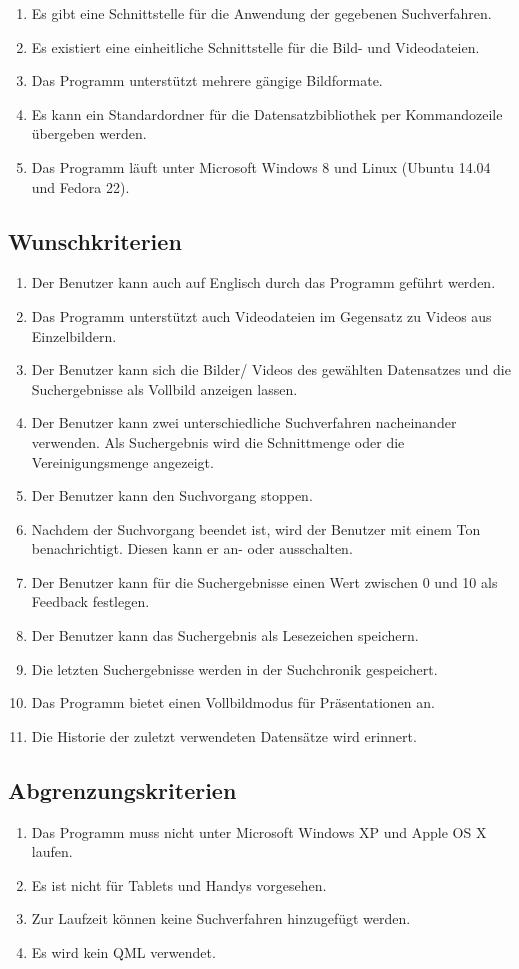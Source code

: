 \begin{enumerate} [label=\bfseries /MK \arabic*0/, leftmargin=*]
\item Es gibt eine Schnittstelle für die Anwendung der gegebenen Suchverfahren.
\item Es existiert eine einheitliche Schnittstelle für die Bild- und Videodateien.
\item Das Programm unterstützt mehrere gängige Bildformate.
\item Es kann ein Standardordner für die Datensatzbibliothek per Kommandozeile übergeben werden.
\item Das Programm läuft unter Microsoft Windows 8 und Linux (Ubuntu 14.04 und Fedora 22).
\end{enumerate}
\subsection{Wunschkriterien}
\begin{enumerate} [label=\bfseries /WK \arabic*0/, leftmargin=*]
\item Der Benutzer kann auch auf Englisch durch das Programm geführt werden.
\item Das Programm unterstützt auch Videodateien im Gegensatz zu Videos aus Einzelbildern.
\item Der Benutzer kann sich die Bilder/ Videos des gewählten Datensatzes und die Suchergebnisse als Vollbild anzeigen lassen.
\item Der Benutzer kann zwei unterschiedliche Suchverfahren nacheinander verwenden. Als Suchergebnis wird die Schnittmenge oder die Vereinigungsmenge angezeigt.
\item Der Benutzer kann den Suchvorgang stoppen.
\item Nachdem der Suchvorgang beendet ist, wird der Benutzer mit einem Ton benachrichtigt. Diesen kann er an- oder ausschalten.
\item Der Benutzer kann für die Suchergebnisse einen Wert zwischen 0 und 10 als \gls{Feedback} festlegen.
\item Der Benutzer kann das Suchergebnis als \gls{Lesezeichen} speichern.
\item Die letzten Suchergebnisse werden in der  {Suchchronik} gespeichert.
\item Das Programm bietet einen Vollbildmodus für Präsentationen an.
\item Die Historie der zuletzt verwendeten Datensätze wird erinnert.
\end{enumerate}
\subsection{Abgrenzungskriterien}
\begin{enumerate} [label=\bfseries /AK \arabic*0/, leftmargin=*]
\item Das Programm muss nicht unter Microsoft Windows XP und Apple OS X laufen. 
\item Es ist nicht für Tablets und Handys vorgesehen.
\item Zur Laufzeit können keine Suchverfahren hinzugefügt werden.
\item Es wird kein QML verwendet.
\end{enumerate}
\pagebreak

